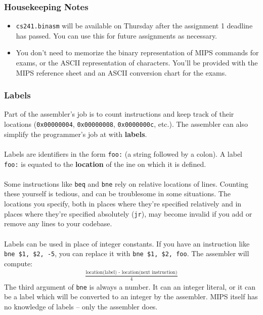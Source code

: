 \documentclass[]{article}
\theoremstyle{definition}
\newcommand{\lecture}[1]{\marginpar{{\footnotesize $\leftarrow$ \underline{#1}}}}
\begin{document}
		\subsubsection{Housekeeping Notes}
			\begin{itemize}
				\item \verb+cs241.binasm+ will be available on Thursday after the assignment 1 deadline has passed. You can use this for future assignments as necessary.
				\item You don't need to memorize the binary representation of MIPS commands for exams, or the ASCII representation of characters. You'll be provided with the MIPS reference sheet and an ASCII conversion chart for the exams.
			\end{itemize}
			\subsubsection{Labels} \lecture{January 16, 2013}
				Part of the assembler's job is to count instructions and keep track of their locations (\verb+0x00000004+, \verb+0x00000008+, \verb+0x0000000c+, etc.). The assembler can also simplify the programmer's job at with \textbf{labels}.
				\\ \\
				Labels are identifiers in the form \verb+foo:+ (a string followed by a colon). A label \verb+foo:+ is equated to the \textbf{location} of the ine on which it is defined.
				\\ \\
				Some instructions like \verb+beq+ and \verb+bne+ rely on relative locations of lines. Counting these yourself is tedious, and can be troublesome in some situations. The locations you specify, both in places where they're specified relatively and in places where they're specified absolutely (\verb+jr+), may become invalid if you add or remove any lines to your codebase.
				\\ \\
				Labels can be used in place of integer constants. If you have an instruction like \verb+bne $1, $2, -5+, you can replace it with \verb+bne $1, $2, foo+. The assembler will compute:
				\begin{align*}
					\frac{\text{location(label) - location(next instruction)}}{4}
				\end{align*}
				The third argument of \verb+bne+ is always a number. It can an integer literal, or it can be a label which will be converted to an integer by the assembler. MIPS itself has no knowledge of labels -- only the assembler does.
\end{document}
